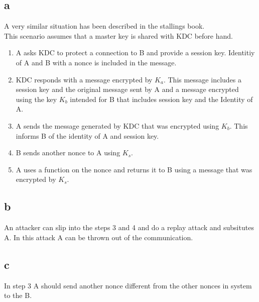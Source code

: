 \documentclass[a4paper, 11pt]{article}
\begin{document}
\subsection{a}
A very similar situation has been described in the stallings book. \\
This scenario assumes that a master key is shared with KDC before hand.
\begin{enumerate}
    \item A asks KDC to protect a connection to B and provide a session key.
        Identitiy of A and B with a nonce is included in the message.
    \item KDC responds with a message encrypted by $K_a$. This message includes
        a session key and the original message sent by A and a message
        encrypted using the key $K_b$ intended for B that includes session key
        and the Identity of A.
    \item A sends the message generated by KDC that was encrypted using $K_b$.
        This informs B of the identity of A and session key.
    \item B sends another nonce to A using $K_s$.
    \item A uses a function on the nonce and returns it to B using a message that was
        encrypted by $K_s$.
\end{enumerate}
\subsection{b}
An attacker can slip into the steps 3 and 4 and do a replay attack and
subsitutes A. In this attack A can be thrown out of the communication.
\subsection{c}
In step 3 A should send another nonce different from the other nonces in system
to the B.
\end{document}
